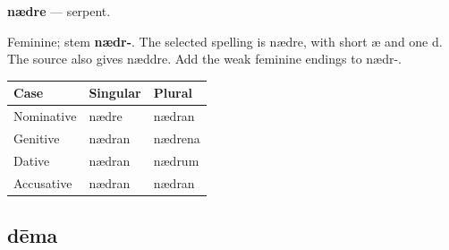 \par\begin{minipage}{\linewidth}\raggedright
\textbf{nædre} — serpent.

Feminine; stem \textbf{nædr-}. The selected spelling is nædre, with short æ and one d. The source also gives næddre. Add the weak feminine endings to nædr-.

\par\begingroup
\fontsize{10.5}{13.2}\selectfont
\setlength{\LTleft}{0pt}\setlength{\LTright}{\fill}
\noindent
\begin{tabular}{@{}>{\raggedright\arraybackslash}p{39.46mm}>{\raggedright\arraybackslash}p{39.46mm}>{\raggedright\arraybackslash}p{39.46mm}@{}}
\toprule
\textbf{Case} & \textbf{Singular} & \textbf{Plural} \\
\midrule
Nominative & nædre & nædran \\
Genitive & nædran & nædrena \\
Dative & nædran & nædrum \\
Accusative & nædran & nædran \\
\bottomrule
\end{tabular}
\par\endgroup

\end{minipage}\par
{}
\subsection*{dēma}

